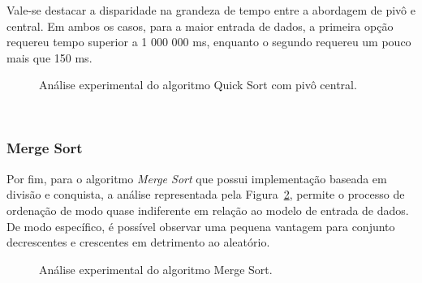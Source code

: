 \documentclass[conference,onecolumn]{IEEEtran}
\begin{document}
Vale-se destacar a disparidade na grandeza de tempo entre a abordagem de pivô e central. Em ambos os casos, para a maior entrada de dados, a primeira opção requereu tempo superior a 1 000 000 ms, enquanto o segundo requereu um pouco mais que 150 ms.

\begin{figure}[H]
\centering
{}
\caption{Análise experimental do algoritmo Quick Sort com pivô central.}
\label{image: graph-quick-central}
\end{figure}

~\\
\subsubsection{Merge Sort}

Por fim, para o algoritmo \textit{Merge Sort} que possui implementação baseada em divisão e conquista, a análise representada pela Figura~\ref{image: graph-merge}, permite o processo de ordenação de modo quase indiferente em relação ao modelo de entrada de dados. De modo específico, é possível observar uma pequena vantagem para conjunto decrescentes e crescentes em detrimento ao aleatório.

\begin{figure}[H]

\centering
{}
\caption{Análise experimental do algoritmo Merge Sort.}
\label{image: graph-merge}
\end{figure}
\end{document}
